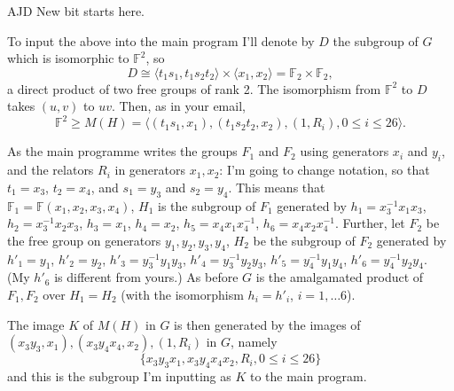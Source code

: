 \documentclass[a4paper,12pt]{article}
\numberwithin{equation}{section}
\numberwithin{figure}{section}
\newcommand{\FF}{\ensuremath{\mathbb{F}}}
\newcommand{\la}{\langle}
\newcommand{\ra}{\rangle}
\newenvironment{ajd1}{\noindent\color{red} AJD }{}
\newcommand{\ajd}[1]{\begin{ajd1} #1 \end{ajd1}}
\begin{document}
\ajd{New bit starts here.\\} 

To input the above into the main program I'll denote by $D$ 
the subgroup of $G$ which is isomorphic to  
$\FF^2$, so 
\[D\cong \la t_1s_1,t_1s_2t_2\ra\times \la x_1,x_2\ra=\FF_2\times \FF_2,\]
a direct product of two free groups of rank 2. The isomorphism from
$\FF^2$ to $D$ takes $(u,v)$ to $uv$. Then, as in your email, 
\[\FF^2\ge M(H)=\la (t_1s_1,x_1), (t_1s_2t_2,x_2), (1,R_i), 0\le i \le 26\ra.\]


As the main programme writes the groups $F_1$ and $F_2$ using generators 
$x_i$ and $y_i$, and the relators $R_i$ in generators $x_1,x_2$: 
 I'm going to change notation, so that $t_1=x_3$, $t_2=x_4$, and  
 $s_1=y_3$ and $s_2=y_4$. This means
that \\
$\FF_1= \FF(x_1,x_2,x_3, x_4)$,
$H_1$ is the subgroup of $F_1$ generated by 
$h_1= x_3^{-1} x_1 x_3$, 
$h_2 = x_3^{-1} x_2 x_3$, 
$h_3 =x_1$, 
$h_4 = x_2$,
$h_5= x_4 x_1 x_4^{-1}$, 
$h_6 = x_4 x_2 x_4^{-1}$.
Further, let $F_2$ be the free group on generators $y_1, y_2, y_3, y_4$,
$H_2$ be the subgroup of $F_2$ generated by 
$h'_1= y_1$, 
$h'_2 = y_2$, 
$h'_3 = y_3^{-1} y_1 y_3 $, 
$h'_4 = y_3^{-1} y_2 y_3$,
$h'_5= y_4^{-1} y_1 y_4$, 
$h'_6 = y_4^{-1} y_2 y_4$.
(My $h'_6$ is different from yours.)
As before $G$ is the amalgamated product  of $F_1, F_2$ over $H_1=H_2$ (with the isomorphism $h_i = h'_i$, $i = 1,\ldots 6$).

The image $K$ of $M(H)$ in $G$ is then generated by 
the images of $ (x_3y_3,x_1), (x_3y_4x_4,x_2), (1,R_i)$ in $G$, namely 
\[\{x_3y_3x_1, x_3y_4x_4x_2, R_i, 0\le i \le 26\}\]
and this is the subgroup I'm inputting as $K$ to the main program.
\end{document}
